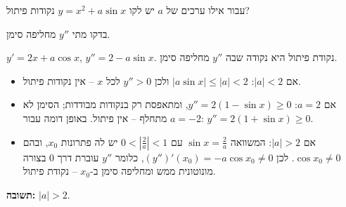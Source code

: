 
\begin{question}
עבור אילו ערכים של $a$ יש לקו $y=x^2+a\sin x$ נקודות פיתול?
\end{question}

\begin{hint}
בדקו מתי $y''$ מחליפה סימן.
\end{hint}

\begin{solution}
$y'=2x+a\cos x$, $y''=2-a\sin x$. נקודת פיתול היא נקודה שבה $y''$ מחליפה סימן.
\begin{itemize}
  \item אם $|a|<2$: $|a\sin x|\le|a|<2$ ולכן $y''>0$ לכל $x$ – אין נקודות פיתול.
  \item אם $a=2$: $y''=2(1-\sin x)\ge0$, ומתאפסת רק בנקודות מבודדות; הסימן לא מתחלף – אין פיתול. באופן דומה עבור $a=-2$: $y''=2(1+\sin x)\ge0$.
  \item אם $|a|>2$: המשוואה $\sin x=\frac2a$ עם $0<\left|\frac2a\right|<1$ יש לה פתרונות $x_0$, ובהם $\cos x_0\ne0$. לכן $(y'')'(x_0)=-a\cos x_0\ne0$, כלומר $y''$ עוברת דרך $0$ בצורה מונוטונית ממש ומחליפה סימן ב-$x_0$ – נקודת פיתול.
\end{itemize}
\textbf{תשובה:} $|a|>2$.
\end{solution}
